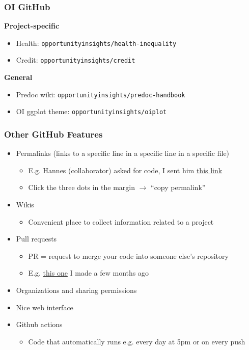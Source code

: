 \documentclass{ali-presentation}
\begin{document}
\begin{frame}
    \frametitle{OI GitHub}

    \textbf{Project-specific}

    \begin{itemize}
        \item Health: \texttt{opportunityinsights/health-inequality}
        \item Credit: \texttt{opportunityinsights/credit}
    \end{itemize}

    \pause
    
    \textbf{General}

    \begin{itemize}
        \item Predoc wiki: \texttt{opportunityinsights/predoc-handbook}
        \item OI ggplot theme: \texttt{opportunityinsights/oiplot}
    \end{itemize}
\end{frame}

\begin{frame}
    \frametitle{Other GitHub Features}

    \begin{itemize}
        \item Permalinks (links to a specific line in a specific line in a specific file)
        \begin{itemize}
            \item E.g. Hannes (collaborator) asked for code, I sent him \href{https://github.com/OpportunityInsights/finer_geos_outside/blob/be912a2cc52a9e24b9e94d9e4d0d0364b42ae4ea/replication_code/code/analysis/misc_oz_scalars.do\#L76}{this link}
            \item Click the three dots in the margin $\rightarrow$ ``copy permalink''
        \end{itemize}
        \item Wikis
        \begin{itemize}
            \item Convenient place to collect information related to a project
        \end{itemize}
        \item Pull requests
        \begin{itemize}
            \item PR = request to merge your code into someone else's repository
            \item E.g. \href{https://github.com/anishathalye/dotbot/pull/377}{this one} I made a few months ago
        \end{itemize}
        \item Organizations and sharing permissions
        \item Nice web interface
        \item Github actions
        \begin{itemize}
            \item Code that automatically runs e.g. every day at 5pm or on every push
        \end{itemize}
    \end{itemize}
\end{frame}
\end{document}
